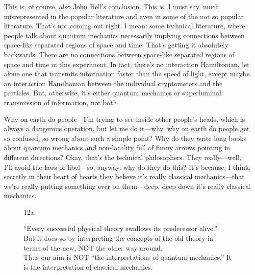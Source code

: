 \documentclass[12pt,nofootinbib]{revtex4}
\begin{document}
This is, of course, also John Bell's conclusion. This is, I must say, much misrepresented in the popular literature and even in some of the not so popular literature. That's not coming out right. I mean: some technical literature, where people talk about quantum mechanics necessarily implying connections between space-like separated regions of space and time. That's getting it absolutely backwards. There are no connections between space-like separated regions of space and time in this experiment. In fact, there's no interaction Hamiltonian, let alone one that transmits information faster than the speed of light, except maybe an interaction Hamiltonian between the individual cryptometers and the particles. But, otherwise, it's either quantum mechanics or superluminal transmission of information, not both.

Why on earth do people---I'm trying to see inside other people's heads, which is always a dangerous operation, but let me do it---why, why on earth do people get so confused, so wrong about such a simple point? Why do they write long books about quantum mechanics and non-locality full of funny arrows pointing in different directions? Okay, that's the technical philosophers. They really---well, I'll avoid the laws of libel---so, anyway, why do they do this? It's because, I think, secretly in their heart of hearts they believe it's really classical mechanics---that we're really putting something over on them---deep, deep down it's really classical mechanics.



\begin{figure}[htb] 
\begin{mdframed}
  \vspace{5pt}\hfill 12a\\ 
  \begin{raggedright}
    ``Every successful physical theory swallows its predecessor alive.''\\[\baselineskip]

    But it does so by interpreting the concepts of the old theory in terms of the new, NOT the other way around.\\[\baselineskip]

    Thus our aim is NOT ``the interpretations of quantum mechanics.''  It is the interpretation of classical mechanics.\\[\baselineskip]
  \end{raggedright}
\vspace{-.5\baselineskip}
\end{mdframed}
\end{figure}
\end{document}
